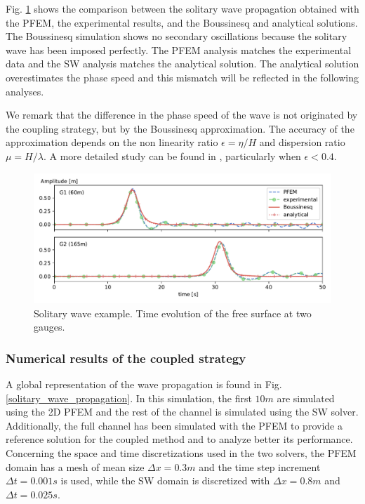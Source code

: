 Fig. \ref{solitary_wave} shows the comparison between the solitary wave propagation obtained with the PFEM, the experimental results, and the Boussinesq and analytical solutions. The Boussinesq simulation shows no secondary oscillations because the solitary wave has been imposed perfectly. The PFEM analysis matches the experimental data and the SW analysis matches the analytical solution. The analytical solution overestimates the phase speed and this mismatch will be reflected in the following analyses. 

We remark that the difference in the phase speed of the wave is not originated by the coupling strategy, but by the Boussinesq approximation. The accuracy of the approximation depends on the non linearity ratio $\epsilon = \eta/H$ and dispersion ratio $\mu = H / \lambda$. A more detailed study can be found in \cite{wu2018}, particularly when $\epsilon<0.4$.


\begin{figure} [htb]
    \centering
    \includegraphics[width=\textwidth]{img/coupling/solitary_wave.pdf}
    \caption{Solitary wave example. Time evolution of the free surface at two gauges.}
    \label{solitary_wave}
\end{figure}



\subsubsection{Numerical results of the coupled strategy}

A global representation of the wave propagation is found in Fig. \ref{solitary_wave_propagation}. In this simulation, the first $10m$ are simulated using the 2D PFEM and the rest of the channel is simulated using the SW solver. Additionally, the full channel has been simulated with the PFEM to provide a reference solution for the coupled method and to analyze better its performance. Concerning the space and time discretizations used in the two solvers, the PFEM domain has a mesh of mean size $\Delta x=0.3m$ and the time step increment $\Delta t=0.001s$ is used, while the SW domain is discretized with $\Delta x=0.8m$ and $\Delta t=0.025s$.

